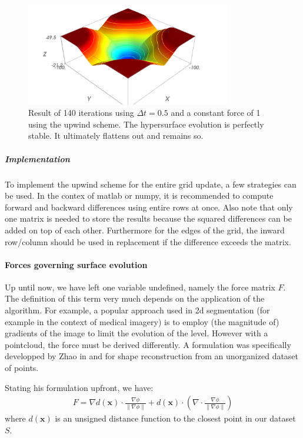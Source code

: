 \documentclass{article}
\begin{document}
\begin{figure}[H]
  \centering
  \includegraphics[width=0.8\textwidth]{img/up02.png}
  \caption{Result of 140 iterations using $ \Delta t = 0.5$ and a constant force
  of 1 using the upwind scheme. The hypersurface evolution is perfectly stable.
  It ultimately flattens out and remains so.}    
\end{figure}

\subparagraph{Implementation}
To implement the upwind scheme for the entire grid
update, a few strategies can be used. In the contex of matlab or numpy, it is
recommended to compute forward and backward differences using entire rows at
once. Also note that only one matrix is needed to store the results because the
squared differences can be added on top of each other.  Furthermore for the
edges of the grid, the inward row/column should be used in replacement if the
difference exceeds the matrix.

\paragraph{Forces governing surface evolution}
Up until now, we have left one variable undefined, namely the force matrix $F$.
The definition of this term very much depends on the application of the
algorithm. For example, a popular approach used in 2d segmentation (for example
in the context of medical imagery) is to employ (the magnitude of) gradients of
the image to limit the evolution of the level. However with a pointcloud, the
force must be derived differently. A formulation was specifically developped by
Zhao in \cite{zhao2000implicit} and \cite{zhao2001fast} for shape reconstruction from an
unorganized dataset of points.

Stating his formulation upfront, we have:
\begin{align}
    \label{eq:force}
    F = \nabla d(\mathbf{x}) \cdot \frac{\nabla \phi}{\| \nabla \phi \|}
+ d(\mathbf{x}) \cdot (\nabla \cdot \frac{\nabla \phi}{\| \nabla \phi \|} )
\end{align}
where $d(\mathbf{x})$ is an unsigned distance function to the closest point in
our dataset $S$.
\end{document}
